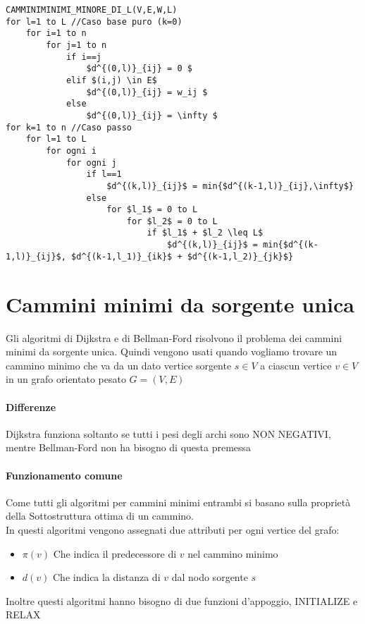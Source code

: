 \documentclass[12pt, a4paper, openany]{book}
\begin{document}
\begin{lstlisting}
CAMMINIMINIMI_MINORE_DI_L(V,E,W,L)
for l=1 to L //Caso base puro (k=0)
    for i=1 to n
        for j=1 to n
            if i==j
                $d^{(0,l)}_{ij} = 0 $
            elif $(i,j) \in E$
                $d^{(0,l)}_{ij} = w_ij $
            else
                $d^{(0,l)}_{ij} = \infty $
for k=1 to n //Caso passo
    for l=1 to L
        for ogni i
            for ogni j
                if l==1
                    $d^{(k,l)}_{ij}$ = min{$d^{(k-1,l)}_{ij},\infty$} 
                else
                    for $l_1$ = 0 to L
                        for $l_2$ = 0 to L
                            if $l_1$ + $l_2 \leq L$
                                $d^{(k,l)}_{ij}$ = min{$d^{(k-1,l)}_{ij}$, $d^{(k-1,l_1)}_{ik}$ + $d^{(k-1,l_2)}_{jk}$} 
\end{lstlisting}

\section{Cammini minimi da sorgente unica}
Gli algoritmi di Dijkstra e di Bellman-Ford risolvono il problema dei cammini minimi da sorgente unica.
Quindi vengono usati quando vogliamo trovare un cammino minimo che va da un dato vertice sorgente $s \in V$ a
ciascun vertice $v \in V$ in un grafo orientato pesato $G = (V, E)$

\paragraph{Differenze}
Dijkstra funziona soltanto se tutti i pesi degli archi sono NON NEGATIVI, mentre
Bellman-Ford non ha bisogno di questa premessa

\paragraph{Funzionamento comune}
Come tutti gli algoritmi per cammini minimi entrambi si basano sulla
proprietà della Sottostruttura ottima di un cammino.\\
In questi algoritmi vengono assegnati due attributi per ogni vertice del grafo:
\begin{itemize}
	\item $\pi(v)$ Che indica il predecessore di $v$ nel cammino minimo
	\item $d(v)$ Che indica la distanza di $v$ dal nodo sorgente $s$
\end{itemize}

Inoltre questi algoritmi hanno bisogno di due funzioni d'appoggio, INITIALIZE e RELAX
\end{document}
